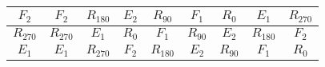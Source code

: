 \documentclass[titlepage]{article}
\begin{document}
\begin{solution}
\begin{table}[h]
{\begin{tabular}{|c| c| c| c| c| c| c| c| c|}
    \cellcolor{gray!20}$F_2$ & \cellcolor{blue!20}$F_2$ &\cellcolor{blue!20} $R_{180}$ &\cellcolor{green!20} $E_2$ &\cellcolor{green!20} $R_{90}$ & \cellcolor{red!20}$F_1$ & \cellcolor{red!20}$R_0$ &\cellcolor{yellow!20} $E_1$ & \cellcolor{yellow!20}$R_{270}$ \\\hline
    \cellcolor{gray!20}$R_{270}$ & \cellcolor{yellow!20}$R_{270}$ &\cellcolor{yellow!20} $E_1$& \cellcolor{red!20}$R_0$& \cellcolor{red!20}$F_1$& \cellcolor{green!20}$R_{90}$& \cellcolor{green!20}$E_2$& \cellcolor{blue!20}$R_{180}$&\cellcolor{blue!20} $F_2$\\\hline
    \cellcolor{gray!20}$E_1$& \cellcolor{yellow!20}$E_1$&\cellcolor{yellow!20} $R_{270}$&\cellcolor{blue!20} $F_2$& \cellcolor{blue!20}$R_{180}$&\cellcolor{green!20} $E_2$& \cellcolor{green!20}$R_{90}$& \cellcolor{red!20}$F_1$& \cellcolor{red!20}$R_0$\\\hline
\end{tabular}}\end{table}\clearpage
\end{solution}
\end{document}
